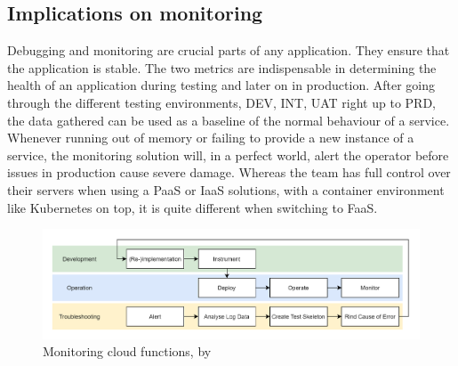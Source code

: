 \documentclass[a4paper,twoside,11pt, pagesize]{scrartcl}
\begin{document}
\subsection{Implications on monitoring}
Debugging and monitoring are crucial parts of any application. They ensure that the application is stable. The two metrics are indispensable in determining the health of an application during testing and later on in production. After going through the different testing environments, DEV, INT, UAT right up to PRD, the data gathered can be used as a baseline of the normal behaviour of a service. Whenever running out of memory or failing to provide a new instance of a service, the monitoring solution will, in a perfect world, alert the operator before issues in production cause severe damage. Whereas the team has full control over their servers when using a PaaS or IaaS solutions, with a container environment like Kubernetes on top, it is quite different when switching to FaaS.
\begin{figure}[H]
\caption{Monitoring cloud functions, by \cite{manner2019troubleshooting}}
\label{fig:manner}
\centering
\includegraphics[width=1\textwidth]{monitoring}
\end{figure}
\end{document}
